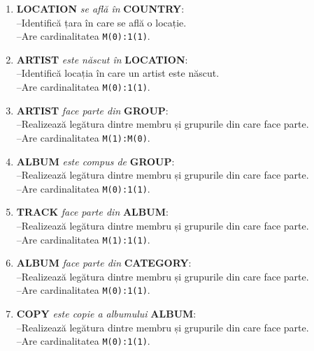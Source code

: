 \documentclass[a4paper,oneside, 12pt]{article}
\begin{document}
\begin{enumerate}[label=\roman*.]

        \item \textbf{LOCATION} \emph{se află în} \textbf{COUNTRY}:
                \\--Identifică țara în care se află o locație.
                \\--Are cardinalitatea {\texttt{M(0):1(1)}.}

        \item \textbf{ARTIST} \emph{este născut în} \textbf{LOCATION}:
                \\--Identifică locația în care un artist este născut.
                \\--Are cardinalitatea {\texttt{M(0):1(1)}.}

        \item \textbf{ARTIST} \emph{face parte din} \textbf{GROUP}:
                \\--Realizează legătura dintre membru și grupurile din care face parte.
                \\--Are cardinalitatea {\texttt{M(1):M(0)}.}

        \item \textbf{ALBUM} \emph{este compus de} \textbf{GROUP}:
                \\--Realizează legătura dintre membru și grupurile din care face parte.
                \\--Are cardinalitatea {\texttt{M(0):1(1)}.}

        \item \textbf{TRACK} \emph{face parte din} \textbf{ALBUM}:
                \\--Realizează legătura dintre membru și grupurile din care face parte.
                \\--Are cardinalitatea {\texttt{M(1):1(1)}.}

        \item \textbf{ALBUM} \emph{face parte din} \textbf{CATEGORY}:
                \\--Realizează legătura dintre membru și grupurile din care face parte.
                \\--Are cardinalitatea {\texttt{M(0):1(1)}.}

        \item \textbf{COPY} \emph{este copie a albumului} \textbf{ALBUM}:
                \\--Realizează legătura dintre membru și grupurile din care face parte.
                \\--Are cardinalitatea {\texttt{M(0):1(1)}.}


\end{enumerate}
\end{document}
